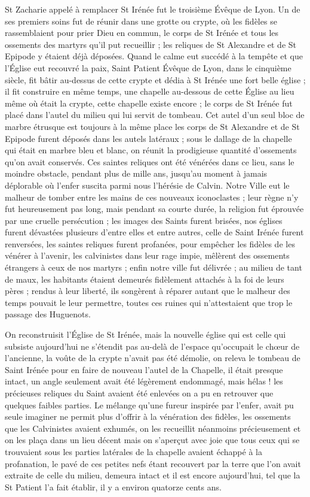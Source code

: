 \documentclass[11pt,a4paper]{report}
\begin{document}
St Zacharie appelé à remplacer St Irénée fut le troisième Évêque de Lyon. Un de ses premiers soins fut de réunir dans une grotte ou crypte, où les fidèles se rassemblaient pour prier Dieu en commun, le corps de St Irénée et tous les ossements des martyrs qu'il put recueillir ; les reliques de St Alexandre et de St Epipode y étaient déjà déposées. Quand le calme eut succédé à la tempête et que l'Église eut recouvré la paix, Saint Patient Évêque de Lyon, dans le cinquième siècle, fit bâtir au-dessus de cette crypte et dédia à St Irénée une fort belle église ; il fit construire en même temps, une chapelle au-dessous de cette Église au lieu même où était la crypte, cette chapelle existe encore ; le corps de St Irénée fut placé dans l'autel du milieu qui lui servit de tombeau. Cet autel d'un seul bloc de marbre étrusque est toujours à la même place les corps de St Alexandre et de St Epipode furent déposés dans les autels latéraux ; sous le dallage de la chapelle qui était en marbre bleu et blanc, on réunit la prodigieuse quantité d'ossements qu'on avait conservés. Ces saintes reliques ont été vénérées dans ce lieu, sans le moindre obstacle, pendant plus de mille ans, jusqu'au moment à jamais déplorable où l'enfer suscita parmi nous l'hérésie de Calvin. Notre Ville eut le malheur de tomber entre les mains de ces nouveaux iconoclastes ; leur règne n'y fut heureusement pas long, mais pendant sa courte durée, la religion fut éprouvée par une cruelle persécution ; les images des Saints furent brisées, nos églises furent dévastées plusieurs d'entre elles et entre autres, celle de Saint Irénée furent renversées, les saintes reliques furent profanées, pour empêcher les fidèles de les vénérer à l'avenir, les calvinistes dans leur rage impie, mêlèrent des ossements étrangers à ceux de nos martyrs ; enfin notre ville fut délivrée ; au milieu de tant de maux, les habitants étaient demeurés fidèlement attachés à la foi de leurs pères ; rendus à leur liberté, ils songèrent à réparer autant que le malheur des temps pouvait le leur permettre, toutes ces ruines qui n'attestaient que trop le passage des Huguenots.

On reconstruisit l'Église de St Irénée, mais la nouvelle église qui est celle qui subsiste aujourd'hui ne s'étendit pas au-delà de l'espace qu'occupait le chœur de l'ancienne, la voûte de la crypte n'avait pas été démolie, on releva le tombeau de Saint Irénée pour en faire de nouveau l'autel de la Chapelle, il était presque intact, un angle seulement avait été légèrement endommagé, mais hélas ! les précieuses reliques du Saint avaient été enlevées on a pu en retrouver que quelques faibles parties. Le mélange qu'une fureur inspirée par l'enfer, avait pu seule imaginer ne permit plus d'offrir à la vénération des fidèles, les ossements que les Calvinistes avaient exhumés, on les recueillit néanmoins précieusement et on les plaça dans un lieu décent mais on s'aperçut avec joie que tous ceux qui se trouvaient sous les parties latérales de la chapelle avaient échappé à la profanation, le pavé de ces petites nefs étant recouvert par la terre que l'on avait extraite de celle du milieu, demeura intact et il est encore aujourd'hui, tel que la St Patient l'a fait établir, il y a environ quatorze cents ans.
\end{document}

